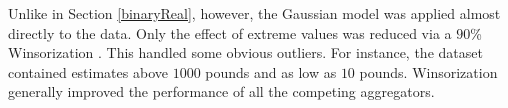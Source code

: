 \documentclass[11pt]{article}
\theoremstyle{definition}
\theoremstyle{definition}
\begin{document}

Unlike in Section  \ref{binaryReal}, however, the Gaussian model was applied almost directly to the data. 
Only the effect of extreme values was reduced via a $90$\% Winsorization \citep{hastings1947low}. This handled some obvious outliers. For instance, the dataset contained estimates above $1000$ pounds and as low as $10$ pounds.  Winsorization generally improved the performance of all the competing aggregators.




\end{document}
